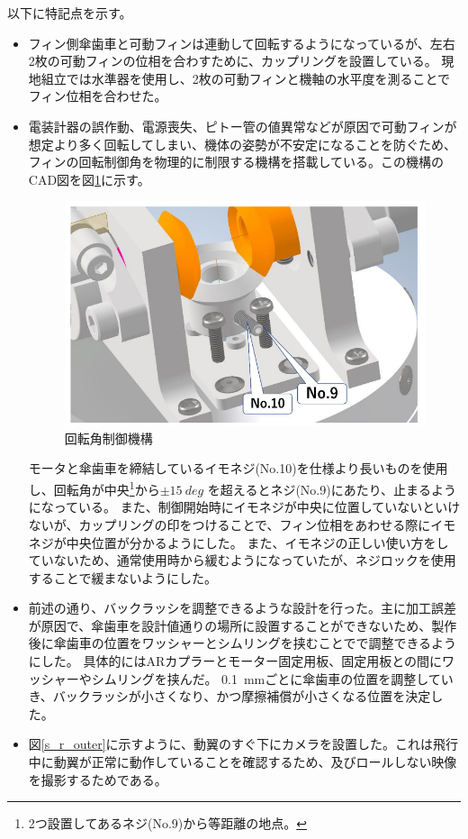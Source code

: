 \documentclass[a4paper,11pt,titlepage,uplatex]{jsarticle}
\begin{document}
以下に特記点を示す。
\begin{itemize}
    \item フィン側傘歯車と可動フィンは連動して回転するようになっているが、左右2枚の可動フィンの位相を合わすために、カップリングを設置している。
    現地組立では水準器を使用し、2枚の可動フィンと機軸の水平度を測ることでフィン位相を合わせた。
    \\
    \item 電装計器の誤作動、電源喪失、ピトー管の値異常などが原因で可動フィンが想定より多く回転してしまい、機体の姿勢が不安定になることを防ぐため、フィンの回転制御角を物理的に制限する機構を搭載している。この機構のCAD図を図\ref{s_r_kadouiki}に示す。
    \begin{figure}[H]
        \centering
        \includegraphics[scale = 0.5]{pic_str/s_r_kadouiki.png}
        \caption{回転角制御機構}
        \label{s_r_kadouiki}
    \end{figure}
    モータと傘歯車を締結しているイモネジ(No.10)を仕様より長いものを使用し、回転角が中央\footnote{2つ設置してあるネジ(No.9)から等距離の地点。}から$\pm \SI{15}{deg}$ を超えるとネジ(No.9)にあたり、止まるようになっている。
    また、制御開始時にイモネジが中央に位置していないといけないが、カップリングの印をつけることで、フィン位相をあわせる際にイモネジが中央位置が分かるようにした。
    また、イモネジの正しい使い方をしていないため、通常使用時から緩むようになっていたが、ネジロックを使用することで緩まないようにした。
    \\
    \item 前述の通り、バックラッシを調整できるような設計を行った。主に加工誤差が原因で、傘歯車を設計値通りの場所に設置することができないため、製作後に傘歯車の位置をワッシャーとシムリングを挟むことでで調整できるようにした。
    具体的にはARカプラーとモーター固定用板、固定用板との間にワッシャーやシムリングを挟んだ。
    \SI{0.1}{mm}ごとに傘歯車の位置を調整していき、バックラッシが小さくなり、かつ摩擦補償が小さくなる位置を決定した。
    \\
    \item 図\ref{s_r_outer}に示すように、動翼のすぐ下にカメラを設置した。これは飛行中に動翼が正常に動作していることを確認するため、及びロールしない映像を撮影するためである。
\end{itemize}
\end{document}
